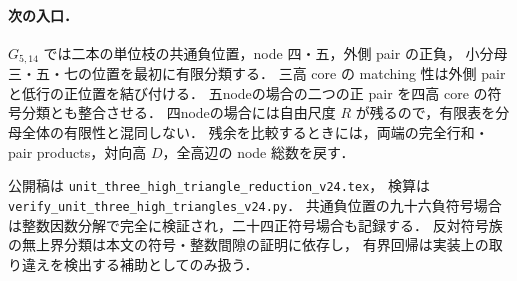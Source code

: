 \paragraph{次の入口．}
$G_{5,14}$ では二本の単位枝の共通負位置，node 四・五，外側 pair の正負，
小分母三・五・七の位置を最初に有限分類する．
三高 core の matching 性は外側 pair と低行の正位置を結び付ける．
五nodeの場合の二つの正 pair を四高 core の符号分類とも整合させる．
四nodeの場合には自由尺度 $R$ が残るので，有限表を分母全体の有限性と混同しない．
残余を比較するときには，両端の完全行和・pair products，対向高 $D$，全高辺の node 総数を戻す．

公開稿は \nolinkurl{unit_three_high_triangle_reduction_v24.tex}，
検算は \nolinkurl{verify_unit_three_high_triangles_v24.py}．
共通負位置の九十六負符号場合は整数因数分解で完全に検証され，二十四正符号場合も記録する．
反対符号族の無上界分類は本文の符号・整数間隙の証明に依存し，
有界回帰は実装上の取り違えを検出する補助としてのみ扱う．
